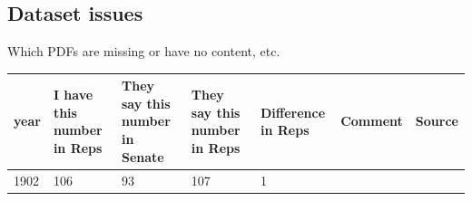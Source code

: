 \documentclass[12pt,]{article}
\theoremstyle{definition}
\theoremstyle{definition}
\theoremstyle{definition}
\theoremstyle{remark}
\begin{document}
\subsection{Dataset issues}\label{dataset-issues}

Which PDFs are missing or have no content, etc.

\begin{longtable}[]{@{}lllllll@{}}
\toprule
\begin{minipage}[b]{0.02\columnwidth}\raggedright\strut
year\strut
\end{minipage} & \begin{minipage}[b]{0.09\columnwidth}\raggedright\strut
I have this number in Reps\strut
\end{minipage} & \begin{minipage}[b]{0.10\columnwidth}\raggedright\strut
They say this number in Senate\strut
\end{minipage} & \begin{minipage}[b]{0.10\columnwidth}\raggedright\strut
They say this number in Reps\strut
\end{minipage} & \begin{minipage}[b]{0.07\columnwidth}\raggedright\strut
Difference in Reps\strut
\end{minipage} & \begin{minipage}[b]{0.11\columnwidth}\raggedright\strut
Comment\strut
\end{minipage} & \begin{minipage}[b]{0.31\columnwidth}\raggedright\strut
Source\strut
\end{minipage}\tabularnewline
\midrule
\endhead
\begin{minipage}[t]{0.02\columnwidth}\raggedright\strut
1902\strut
\end{minipage} & \begin{minipage}[t]{0.09\columnwidth}\raggedright\strut
106\strut
\end{minipage} & \begin{minipage}[t]{0.10\columnwidth}\raggedright\strut
93\strut
\end{minipage} & \begin{minipage}[t]{0.10\columnwidth}\raggedright\strut
107\strut
\end{minipage} & \begin{minipage}[t]{0.07\columnwidth}\raggedright\strut
1\strut
\end{minipage} & \begin{minipage}[t]{0.11\columnwidth}\raggedright\strut

\end{minipage}
\end{longtable}
\end{document}

